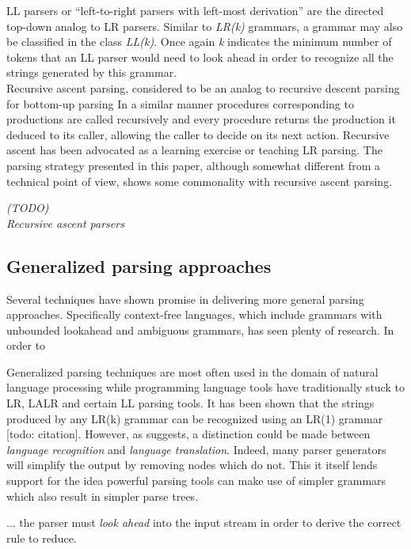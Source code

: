 \documentclass[a4paper,11pt]{article}
\begin{document}
LL parsers or ``left-to-right parsers with left-most derivation'' are the directed top-down analog to LR parsers.
Similar to \emph{LR(k)} grammars, a grammar may also be classified in the class \emph{LL(k)}. 
Once again \emph{k} indicates the minimum number of tokens that an LL parser would need to look ahead in order to recognize all the strings generated by this grammar.\\

Recursive ascent parsing, considered to be an analog to recursive descent parsing for bottom-up parsing %
In a similar manner procedures corresponding to productions are called recursively and every procedure returns the production it deduced to its caller, allowing the caller to decide on its next action.
Recursive ascent has been advocated as a learning exercise or teaching LR parsing. %
The parsing strategy presented in this paper, although somewhat different from a technical point of view, shows some commonality with recursive ascent parsing.

\emph{(TODO)\\ %
Recursive ascent parsers \cite{13326, 47909, 770849} }

\subsection{Generalized parsing approaches}

Several techniques have shown promise in delivering more general parsing approaches.
Specifically context-free languages, which include grammars with unbounded lookahead and ambiguous grammars, has seen plenty of research.
In order to 

Generalized parsing techniques are most often used in the domain of natural language processing while programming language tools have traditionally stuck to LR, LALR and certain LL parsing tools.
It has been shown that the strings produced by any LR(k) grammar can be recognized using an LR(1) grammar [todo: citation].
However, as \cite{Parr95lland} suggests, a distinction could be made between \emph{language recognition} and \emph{language translation}. 
Indeed, many parser generators will simplify the output by removing nodes which do not. 
This it itself lends support for the idea powerful parsing tools can make use of simpler grammars which also result in simpler parse trees.

... the parser must \emph{look ahead} into the input stream in order to derive the correct rule to reduce.
\end{document}
